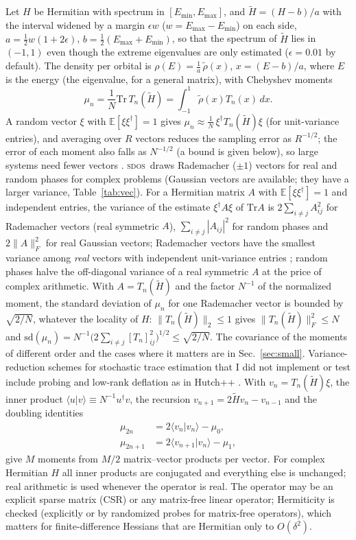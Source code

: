 \documentclass[reprint,nofootinbib,superscriptaddress,amsmath,amssymb,aps,prb,floatfix]{revtex4-2}
\newcommand{\sdos}{\textsc{sdos}}
\newcommand{\Tr}{\mathrm{Tr}}
\begin{document}
Let $H$ be Hermitian with spectrum in $[E_{\min},E_{\max}]$, and $\tilde H=(H-b)/a$ with the interval widened by a margin $\epsilon w$ ($w=E_{\max}-E_{\min}$) on each side, $a=\tfrac12 w(1+2\epsilon)$, $b=\tfrac12(E_{\max}+E_{\min})$, so that the spectrum of $\tilde H$ lies in $(-1,1)$ even though the extreme eigenvalues are only estimated ($\epsilon=0.01$ by default).
The density per orbital is $\rho(E)=\frac{1}{a}\,\tilde\rho(x)$, $x=(E-b)/a$, where $E$ is the energy (the eigenvalue, for a general matrix), with Chebyshev moments
\begin{equation}
\mu_n=\frac1N\Tr\,T_n(\tilde H)=\int_{-1}^{1}\tilde\rho(x)T_n(x)\,dx .
\end{equation}
A random vector $\xi$ with $\mathbb E[\xi\xi^\dagger]=1$ gives $\mu_n\approx\frac1{N}\,\xi^\dagger T_n(\tilde H)\xi$ (for unit-variance entries), and averaging over $R$ vectors reduces the sampling error as $R^{-1/2}$; the error of each moment also falls as $N^{-1/2}$ (a bound is given below), so large systems need fewer vectors \cite{hutchinson,skilling,lin}.
\sdos\ draws Rademacher ($\pm1$) vectors for real and random phases for complex problems (Gaussian vectors are available; they have a larger variance, Table~\ref{tab:vec}).
For a Hermitian matrix $A$ with $\mathbb E[\xi\xi^\dagger]=1$ and independent entries, the variance of the estimate $\xi^\dagger A\xi$ of $\Tr A$ is $2\sum_{i\ne j}A_{ij}^2$ for Rademacher vectors (real symmetric $A$), $\sum_{i\ne j}|A_{ij}|^2$ for random phases and $2\|A\|_F^2$ for real Gaussian vectors; Rademacher vectors have the smallest variance among \emph{real} vectors with independent unit-variance entries \cite{hutchinson}; random phases halve the off-diagonal variance of a real symmetric $A$ at the price of complex arithmetic. With $A=T_n(\tilde H)$ and the factor $N^{-1}$ of the normalized moment, the standard deviation of $\mu_n$ for one Rademacher vector is bounded by $\sqrt{2/N}$, whatever the locality of $H$: $\|T_n(\tilde H)\|_2\le1$ gives $\|T_n(\tilde H)\|_F^2\le N$ and $\mathrm{sd}(\mu_n)=N^{-1}\bigl(2\sum_{i\ne j}[T_n]_{ij}^2\bigr)^{1/2}\le\sqrt{2/N}$. The covariance of the moments of different order and the cases where it matters are in Sec.~\ref{sec:small}. Variance-reduction schemes for stochastic trace estimation that I did not implement or test include probing \cite{tang} and low-rank deflation as in Hutch++ \cite{hutchpp}.
With $v_n=T_n(\tilde H)\xi$, the inner product $\langle u|v\rangle\equiv N^{-1}u^\dagger v$, the recursion $v_{n+1}=2\tilde Hv_n-v_{n-1}$ and the doubling identities
\begin{align}
\mu_{2n}&=2\langle v_n|v_n\rangle-\mu_0,\\ \mu_{2n+1}&=2\langle v_{n+1}|v_n\rangle-\mu_1,
\end{align}
give $M$ moments from $M/2$ matrix--vector products per vector.
For complex Hermitian $H$ all inner products are conjugated and everything else is unchanged; real arithmetic is used whenever the operator is real.
The operator may be an explicit sparse matrix (CSR) or any matrix-free linear operator; Hermiticity is checked (explicitly or by randomized probes for matrix-free operators), which matters for finite-difference Hessians that are Hermitian only to $O(\delta^2)$.
\end{document}
